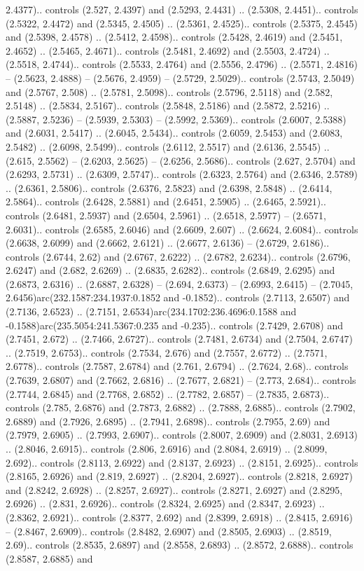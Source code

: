 2.4377).. controls (2.527, 2.4397) and (2.5293, 2.4431) .. (2.5308, 2.4451).. controls (2.5322, 2.4472) and (2.5345, 2.4505) .. (2.5361, 2.4525).. controls (2.5375, 2.4545) and (2.5398, 2.4578) .. (2.5412, 2.4598).. controls (2.5428, 2.4619) and (2.5451, 2.4652) .. (2.5465, 2.4671).. controls (2.5481, 2.4692) and (2.5503, 2.4724) .. (2.5518, 2.4744).. controls (2.5533, 2.4764) and (2.5556, 2.4796) .. (2.5571, 2.4816) -- (2.5623, 2.4888) -- (2.5676, 2.4959) -- (2.5729, 2.5029).. controls (2.5743, 2.5049) and (2.5767, 2.508) .. (2.5781, 2.5098).. controls (2.5796, 2.5118) and (2.582, 2.5148) .. (2.5834, 2.5167).. controls (2.5848, 2.5186) and (2.5872, 2.5216) .. (2.5887, 2.5236) -- (2.5939, 2.5303) -- (2.5992, 2.5369).. controls (2.6007, 2.5388) and (2.6031, 2.5417) .. (2.6045, 2.5434).. controls (2.6059, 2.5453) and (2.6083, 2.5482) .. (2.6098, 2.5499).. controls (2.6112, 2.5517) and (2.6136, 2.5545) .. (2.615, 2.5562) -- (2.6203, 2.5625) -- (2.6256, 2.5686).. controls (2.627, 2.5704) and (2.6293, 2.5731) .. (2.6309, 2.5747).. controls (2.6323, 2.5764) and (2.6346, 2.5789) .. (2.6361, 2.5806).. controls (2.6376, 2.5823) and (2.6398, 2.5848) .. (2.6414, 2.5864).. controls (2.6428, 2.5881) and (2.6451, 2.5905) .. (2.6465, 2.5921).. controls (2.6481, 2.5937) and (2.6504, 2.5961) .. (2.6518, 2.5977) -- (2.6571, 2.6031).. controls (2.6585, 2.6046) and (2.6609, 2.607) .. (2.6624, 2.6084).. controls (2.6638, 2.6099) and (2.6662, 2.6121) .. (2.6677, 2.6136) -- (2.6729, 2.6186).. controls (2.6744, 2.62) and (2.6767, 2.6222) .. (2.6782, 2.6234).. controls (2.6796, 2.6247) and (2.682, 2.6269) .. (2.6835, 2.6282).. controls (2.6849, 2.6295) and (2.6873, 2.6316) .. (2.6887, 2.6328) -- (2.694, 2.6373) -- (2.6993, 2.6415) -- (2.7045, 2.6456)arc(232.1587:234.1937:0.1852 and -0.1852).. controls (2.7113, 2.6507) and (2.7136, 2.6523) .. (2.7151, 2.6534)arc(234.1702:236.4696:0.1588 and -0.1588)arc(235.5054:241.5367:0.235 and -0.235).. controls (2.7429, 2.6708) and (2.7451, 2.672) .. (2.7466, 2.6727).. controls (2.7481, 2.6734) and (2.7504, 2.6747) .. (2.7519, 2.6753).. controls (2.7534, 2.676) and (2.7557, 2.6772) .. (2.7571, 2.6778).. controls (2.7587, 2.6784) and (2.761, 2.6794) .. (2.7624, 2.68).. controls (2.7639, 2.6807) and (2.7662, 2.6816) .. (2.7677, 2.6821) -- (2.773, 2.684).. controls (2.7744, 2.6845) and (2.7768, 2.6852) .. (2.7782, 2.6857) -- (2.7835, 2.6873).. controls (2.785, 2.6876) and (2.7873, 2.6882) .. (2.7888, 2.6885).. controls (2.7902, 2.6889) and (2.7926, 2.6895) .. (2.7941, 2.6898).. controls (2.7955, 2.69) and (2.7979, 2.6905) .. (2.7993, 2.6907).. controls (2.8007, 2.6909) and (2.8031, 2.6913) .. (2.8046, 2.6915).. controls (2.806, 2.6916) and (2.8084, 2.6919) .. (2.8099, 2.692).. controls (2.8113, 2.6922) and (2.8137, 2.6923) .. (2.8151, 2.6925).. controls (2.8165, 2.6926) and (2.819, 2.6927) .. (2.8204, 2.6927).. controls (2.8218, 2.6927) and (2.8242, 2.6928) .. (2.8257, 2.6927).. controls (2.8271, 2.6927) and (2.8295, 2.6926) .. (2.831, 2.6926).. controls (2.8324, 2.6925) and (2.8347, 2.6923) .. (2.8362, 2.6921).. controls (2.8377, 2.692) and (2.8399, 2.6918) .. (2.8415, 2.6916) -- (2.8467, 2.6909).. controls (2.8482, 2.6907) and (2.8505, 2.6903) .. (2.8519, 2.69).. controls (2.8535, 2.6897) and (2.8558, 2.6893) .. (2.8572, 2.6888).. controls (2.8587, 2.6885) and 